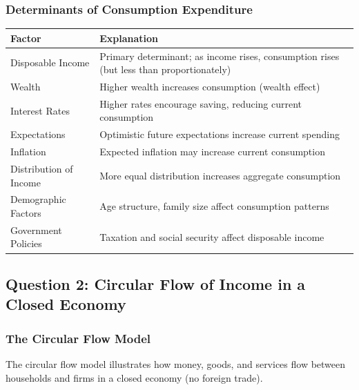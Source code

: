 \documentclass[12pt,a4paper]{article}
\begin{document}
\subsubsection*{Determinants of Consumption Expenditure}
\begin{center}
\begin{tabular}{@{}p{4cm}p{10cm}@{}}
\toprule
\textbf{Factor} & \textbf{Explanation} \\
\midrule
Disposable Income & Primary determinant; as income rises, consumption rises (but less than proportionately) \\
\addlinespace
Wealth & Higher wealth increases consumption (wealth effect) \\
\addlinespace
Interest Rates & Higher rates encourage saving, reducing current consumption \\
\addlinespace
Expectations & Optimistic future expectations increase current spending \\
\addlinespace
Inflation & Expected inflation may increase current consumption \\
\addlinespace
Distribution of Income & More equal distribution increases aggregate consumption \\
\addlinespace
Demographic Factors & Age structure, family size affect consumption patterns \\
\addlinespace
Government Policies & Taxation and social security affect disposable income \\
\bottomrule
\end{tabular}
\end{center}


\subsection{Question 2: Circular Flow of Income in a Closed Economy}

\subsubsection*{The Circular Flow Model}
The circular flow model illustrates how money, goods, and services flow between households and firms in a closed economy (no foreign trade).
\end{document}
